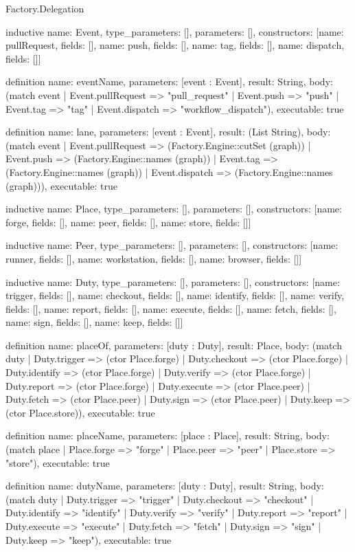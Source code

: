 \begin{lexlean}{Factory.Delegation}
\begin{semanticmodule}
inductive{
  name: Event,
  type_parameters: [],
  parameters: [],
  constructors: [{name: pullRequest, fields: []}, {name: push, fields: []}, {name: tag, fields: []}, {name: dispatch, fields: []}]
}

definition{
  name: eventName,
  parameters: [event : Event],
  result: String,
  body: (match event
    | Event.pullRequest => "pull_request"
    | Event.push => "push"
    | Event.tag => "tag"
    | Event.dispatch => "workflow_dispatch"),
  executable: true
}

definition{
  name: lane,
  parameters: [event : Event],
  result: (List String),
  body: (match event
    | Event.pullRequest => (Factory.Engine::cutSet (graph))
    | Event.push => (Factory.Engine::names (graph))
    | Event.tag => (Factory.Engine::names (graph))
    | Event.dispatch => (Factory.Engine::names (graph))),
  executable: true
}

inductive{
  name: Place,
  type_parameters: [],
  parameters: [],
  constructors: [{name: forge, fields: []}, {name: peer, fields: []}, {name: store, fields: []}]
}

inductive{
  name: Peer,
  type_parameters: [],
  parameters: [],
  constructors: [{name: runner, fields: []}, {name: workstation, fields: []}, {name: browser, fields: []}]
}

inductive{
  name: Duty,
  type_parameters: [],
  parameters: [],
  constructors: [{name: trigger, fields: []}, {name: checkout, fields: []}, {name: identify, fields: []}, {name: verify, fields: []}, {name: report, fields: []}, {name: execute, fields: []}, {name: fetch, fields: []}, {name: sign, fields: []}, {name: keep, fields: []}]
}

definition{
  name: placeOf,
  parameters: [duty : Duty],
  result: Place,
  body: (match duty
    | Duty.trigger => (ctor Place.forge)
    | Duty.checkout => (ctor Place.forge)
    | Duty.identify => (ctor Place.forge)
    | Duty.verify => (ctor Place.forge)
    | Duty.report => (ctor Place.forge)
    | Duty.execute => (ctor Place.peer)
    | Duty.fetch => (ctor Place.peer)
    | Duty.sign => (ctor Place.peer)
    | Duty.keep => (ctor Place.store)),
  executable: true
}

definition{
  name: placeName,
  parameters: [place : Place],
  result: String,
  body: (match place
    | Place.forge => "forge"
    | Place.peer => "peer"
    | Place.store => "store"),
  executable: true
}

definition{
  name: dutyName,
  parameters: [duty : Duty],
  result: String,
  body: (match duty
    | Duty.trigger => "trigger"
    | Duty.checkout => "checkout"
    | Duty.identify => "identify"
    | Duty.verify => "verify"
    | Duty.report => "report"
    | Duty.execute => "execute"
    | Duty.fetch => "fetch"
    | Duty.sign => "sign"
    | Duty.keep => "keep"),
  executable: true
}


\end{semanticmodule}
\end{lexlean}
